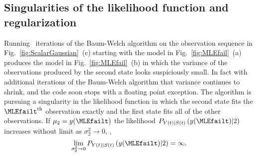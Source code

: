 \subsection{Singularities of the likelihood function and regularization}
\label{sec:regularization}

Running \MLEfailIterations~iterations of the Baum-Welch algorithm on
the observation sequence in Fig.~\ref{fig:ScalarGaussian}~(c) starting
with the model in Fig.~\ref{fig:MLEfail}~(a) produces the model in
Fig.~\ref{fig:MLEfail}~(b) in which the variance of the observations
produced by the second state looks suspiciously small.  In fact with
additional iterations of the Baum-Welch algorithm that variance
continues to shrink, and the code soon stops with a floating point
exception.  The algorithm is pursuing a singularity in the likelihood
function in which the second state fits the $\MLEfailt^{\text{th}}$
observation exactly and the first state fits all of the other
observations.  If $\mu_2 = \ti{y}{\MLEfailt}$ the likelihood
$P_{\ti{Y}{t}|\ti{S}{t}} \left(\ti{y}{\MLEfailt}|2 \right)$ increases
without limit as $\sigma^2_2 \rightarrow 0$, \ie,
\begin{equation*}
  \lim_{\sigma^2_2 \rightarrow 0} P_{\ti{Y}{t}|\ti{S}{t}}
  \left(\ti{y}{\MLEfailt}|2 \right) = \infty.
\end{equation*}

